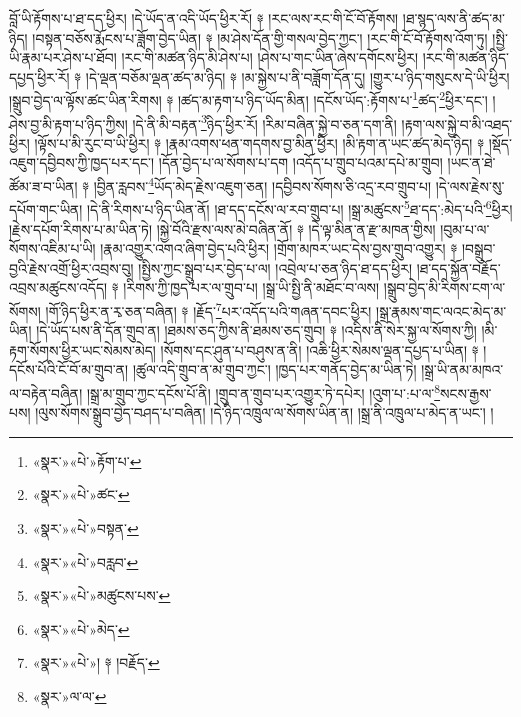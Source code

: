 བློ་ཡི་རྟོགས་པ་ཐ་དད་ཕྱིར། །དེ་ཡོད་ན་འདི་ཡོད་ཕྱིར་རོ། ༈ །རང་ལས་རང་གི་ངོ་བོ་རྟོགས། །ཐ་སྙད་ལས་ནི་ཚད་མ་ཉིད། །བསྟན་བཅོས་རྨོངས་པ་ཟློག་བྱེད་ཡིན། ༈ །མ་ཤེས་དོན་གྱི་གསལ་བྱེད་ཀྱང་། །རང་གི་ངོ་བོ་རྟོགས་འོག་ཏུ། །སྤྱི་ཡི་རྣམ་པར་ཤེས་པ་ཐོབ། །རང་གི་མཚན་ཉིད་མི་ཤེས་པ། །ཤེས་པ་གང་ཡིན་ཞེས་དགོངས་ཕྱིར། །རང་གི་མཚན་ཉིད་དཔྱད་ཕྱིར་རོ། ༈ །དེ་ལྡན་བཅོམ་ལྡན་ཚད་མ་ཉིད། ༈ །མ་སྐྱེས་པ་ནི་བཟློག་དོན་དུ། །གྱུར་པ་ཉིད་གསུངས་དེ་ཡི་ཕྱིར། །སྒྲུབ་བྱེད་ལ་ལྟོས་ཚང་ཡིན་རིགས། ༈ །ཚད་མ་རྟག་པ་ཉིད་ཡོད་མིན། །དངོས་ཡོད་:རྟོགས་པ་\footnote{«སྣར་»«པེ་»རྟོག་པ་}ཚད་\footnote{«སྣར་»«པེ་»ཚང་}ཕྱིར་དང་། །ཤེས་བྱ་མི་རྟག་པ་ཉིད་ཀྱིས། །དེ་ནི་མི་བརྟན་\footnote{«སྣར་»«པེ་»བསྟན་}ཉིད་ཕྱིར་རོ། །རིམ་བཞིན་སྐྱེ་བ་ཅན་དག་ནི། །རྟག་ལས་སྐྱེ་བ་མི་འཐད་ཕྱིར། །ལྟོས་པ་མི་རུང་བ་ཡི་ཕྱིར། ༈ །རྣམ་འགས་ཕན་གདགས་བྱ་མིན་ཕྱིར། །མི་རྟག་ན་ཡང་ཚད་མེད་ཉིད། ༈ །སྡོད་འཇུག་དབྱིབས་ཀྱི་ཁྱད་པར་དང་། །དོན་བྱེད་པ་ལ་སོགས་པ་དག །འདོད་པ་གྲུབ་པའམ་དཔེ་མ་གྲུབ། །ཡང་ན་ཐེ་ཚོམ་ཟ་བ་ཡིན། ༈ །བྱིན་རླབས་\footnote{«སྣར་»«པེ་»བརླབ་}ཡོད་མེད་རྗེས་འཇུག་ཅན། །དབྱིབས་སོགས་ཅི་འདྲ་རབ་གྲུབ་པ། །དེ་ལས་རྗེས་སུ་དཔོག་གང་ཡིན། །དེ་ནི་རིགས་པ་ཉིད་ཡིན་ནོ། །ཐ་དད་དངོས་ལ་རབ་གྲུབ་པ། །སྒྲ་མཚུངས་\footnote{«སྣར་»«པེ་»མཚུངས་པས་}ཐ་དད་:མེད་པའི་\footnote{«སྣར་»«པེ་»མེད་}ཕྱིར། །རྗེས་དཔོག་རིགས་པ་མ་ཡིན་ཏེ། །སྐྱེ་བོའི་རྫས་ལས་མེ་བཞིན་ནོ། ༈ །དེ་ལྟ་མིན་ན་རྫ་མཁན་གྱིས། །བུམ་པ་ལ་སོགས་འཇིམ་པ་ཡི། །རྣམ་འགྱུར་འགའ་ཞིག་བྱེད་པའི་ཕྱིར། །གྲོག་མཁར་ཡང་དེས་བྱས་གྲུབ་འགྱུར། ༈ །བསྒྲུབ་བྱའི་རྗེས་འགྲོ་ཕྱིར་འབྲས་བུ། །སྤྱིས་ཀྱང་སྒྲུབ་པར་བྱེད་པ་ལ། །འབྲེལ་པ་ཅན་ཉིད་ཐ་དད་ཕྱིར། །ཐ་དད་སྐྱོན་བརྗོད་འབྲས་མཚུངས་འདོད། ༈ །རིགས་ཀྱི་ཁྱད་པར་ལ་གྲུབ་པ། །སྒྲ་ཡི་སྤྱི་ནི་མཐོང་བ་ལས། །སྒྲུབ་བྱེད་མི་རིགས་ངག་ལ་སོགས། །གོ་ཉིད་ཕྱིར་ན་རྭ་ཅན་བཞིན། ༈ །རྗོད་\footnote{«སྣར་»«པེ་»། ༈ །བརྗོད་}པར་འདོད་པའི་གཞན་དབང་ཕྱིར། །སྒྲ་རྣམས་གང་ལའང་མེད་མ་ཡིན། །དེ་ཡོད་པས་ནི་དོན་གྲུབ་ན། །ཐམས་ཅད་ཀྱིས་ནི་ཐམས་ཅད་གྲུབ། ༈ །འདིས་ནི་སེར་སྐྱ་ལ་སོགས་ཀྱི། །མི་རྟག་སོགས་ཕྱིར་ཡང་སེམས་མེད། །སོགས་དང་ཤུན་པ་བཤུས་ན་ནི། །འཆི་ཕྱིར་སེམས་ལྡན་དཔྱད་པ་ཡིན། ༈ །དངོས་པོའི་ངོ་བོ་མ་གྲུབ་ན། །ཚུལ་འདི་གྲུབ་ན་མ་གྲུབ་ཀྱང་། །ཁྱད་པར་གནོད་བྱེད་མ་ཡིན་ཏེ། །སྒྲ་ཡི་ནམ་མཁའ་ལ་བརྟེན་བཞིན། །སྒྲ་མ་གྲུབ་ཀྱང་དངོས་པོ་ནི། །གྲུབ་ན་གྲུབ་པར་འགྱུར་ཏེ་དཔེར། །འུག་པ་:པ་ལ་\footnote{«སྣར་»ལ་ལ་}སངས་རྒྱས་པས། །ལུས་སོགས་སྒྲུབ་བྱེད་བཤད་པ་བཞིན། །དེ་ཉིད་འཁྲུལ་ལ་སོགས་ཡིན་ན། །སྒྲ་ནི་འཁྲུལ་པ་མེད་ན་ཡང་། །
